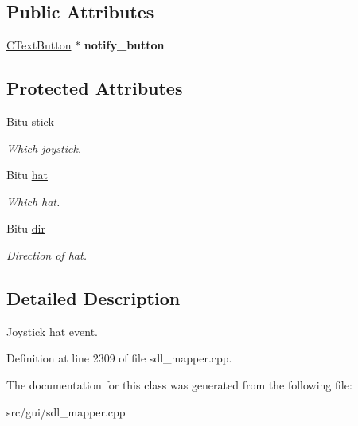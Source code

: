\subsection*{Public Attributes}
\begin{DoxyCompactItemize}
\item 
\hypertarget{classCJHatEvent_a4d7f2a971b1ecad29e15806dfedfbbf4}{\hyperlink{classCTextButton}{C\-Text\-Button} $\ast$ {\bfseries notify\-\_\-button}}\label{classCJHatEvent_a4d7f2a971b1ecad29e15806dfedfbbf4}

\end{DoxyCompactItemize}
\subsection*{Protected Attributes}
\begin{DoxyCompactItemize}
\item 
\hypertarget{classCJHatEvent_a53d2e407f823a8bd30a2c0d5613cb29b}{Bitu \hyperlink{classCJHatEvent_a53d2e407f823a8bd30a2c0d5613cb29b}{stick}}\label{classCJHatEvent_a53d2e407f823a8bd30a2c0d5613cb29b}

\begin{DoxyCompactList}\small\item\em Which joystick. \end{DoxyCompactList}\item 
\hypertarget{classCJHatEvent_a33cb6a20470c519958c6fd0929bcc7cd}{Bitu \hyperlink{classCJHatEvent_a33cb6a20470c519958c6fd0929bcc7cd}{hat}}\label{classCJHatEvent_a33cb6a20470c519958c6fd0929bcc7cd}

\begin{DoxyCompactList}\small\item\em Which hat. \end{DoxyCompactList}\item 
\hypertarget{classCJHatEvent_a8f7cc4b080b4f6054d6da118209683b7}{Bitu \hyperlink{classCJHatEvent_a8f7cc4b080b4f6054d6da118209683b7}{dir}}\label{classCJHatEvent_a8f7cc4b080b4f6054d6da118209683b7}

\begin{DoxyCompactList}\small\item\em Direction of hat. \end{DoxyCompactList}\end{DoxyCompactItemize}


\subsection{Detailed Description}
Joystick hat event. 

Definition at line 2309 of file sdl\-\_\-mapper.\-cpp.



The documentation for this class was generated from the following file\-:\begin{DoxyCompactItemize}
\item 
src/gui/sdl\-\_\-mapper.\-cpp\end{DoxyCompactItemize}
